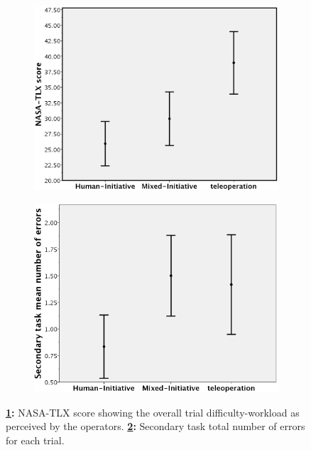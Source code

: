 \documentclass[a4paper,12pt,oneside,openright]{bhamthesis}
\begin{document}
	\begin{figure}
		\centering
		\begin{subfigure}[b]{0.49\textwidth}
			\centering
			\includegraphics[width=\textwidth]{chapter5_fig/exp3_NASA-TLX.png}
			\caption{}
			\label{subfig:nasa-tlx_exp3}
		\end{subfigure}
		\hfill
		\begin{subfigure}[b]{0.49\textwidth}
			\centering
			\includegraphics[width=\textwidth]{chapter5_fig/exp3_secondary_mistakes.png}
			\caption{}
			\label{subfig:secondary_mistakes_exp3}
		\end{subfigure}
		\hfill
		\caption{\textbf{\ref{subfig:nasa-tlx_exp3}:} NASA-TLX score showing the overall trial difficulty-workload as perceived by the operators. \textbf{\ref{subfig:secondary_mistakes_exp3}:} Secondary task total number of errors for each trial.}
		\label{fig:nasa_secondary_mistakes_exp3}
	\end{figure}
\end{document}
